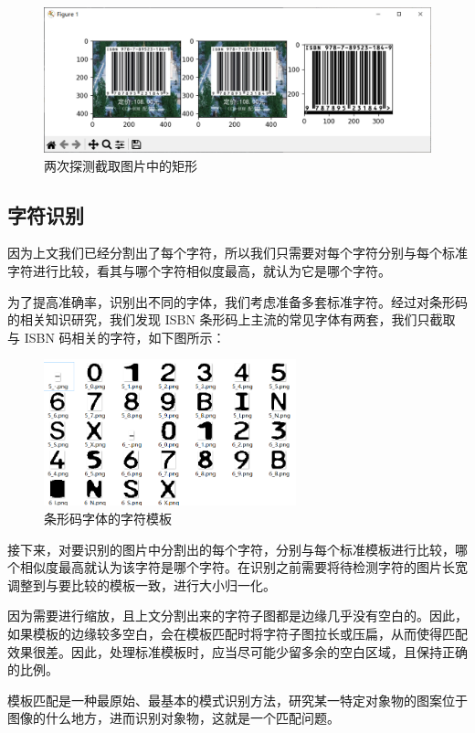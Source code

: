 \documentclass{ctexart}
\begin{document}
\begin{figure}[H]
    \centering
    \includegraphics[height=120pt]{sample_graphSplit2}
    \caption{两次探测截取图片中的矩形}
\end{figure}


\subsection{字符识别}

因为上文我们已经分割出了每个字符，所以我们只需要对每个字符分别与每个标准字符进行比较，看其与哪个字符相似度最高，就认为它是哪个字符。

为了提高准确率，识别出不同的字体，我们考虑准备多套标准字符。经过对条形码的相关知识研究，我们发现 ISBN 条形码上主流的常见字体有两套，我们只截取与 ISBN 码相关的字符，如下图所示：

\begin{figure}[H]
    \centering
    \includegraphics[height=120pt]{standard_fonts2}
    \caption{条形码字体的字符模板}
\end{figure}

接下来，对要识别的图片中分割出的每个字符，分别与每个标准模板进行比较，哪个相似度最高就认为该字符是哪个字符。在识别之前需要将待检测字符的图片长宽调整到与要比较的模板一致，进行大小归一化。

因为需要进行缩放，且上文分割出来的字符子图都是边缘几乎没有空白的。因此，如果模板的边缘较多空白，会在模板匹配时将字符子图拉长或压扁，从而使得匹配效果很差。因此，处理标准模板时，应当尽可能少留多余的空白区域，且保持正确的比例。

模板匹配是一种最原始、最基本的模式识别方法，研究某一特定对象物的图案位于图像的什么地方，进而识别对象物，这就是一个匹配问题。
\end{document}
